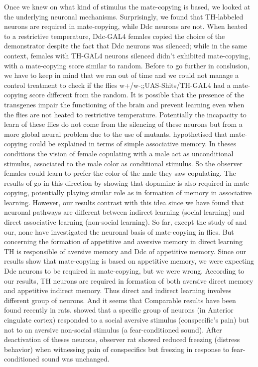 \documentclass[a4paper, 12pt]{article}
\begin{document}
Once we knew on what kind of stimulus the mate-copying is based, we looked at the underlying neuronal mechanisms. 
Surprisingly, we found that TH-labbeled neurons are required in mate-copying, while Ddc neurons are not. 
When heated to a restrictive temperature, Ddc-GAL4 females copied the choice of the demonstrator despite the fact that Ddc neurons was silenced; while in the same context, females with TH-GAL4 neurons silenced didn't exhibited mate-copying, with a mate-copying score similar to random. Before to go further in conslusion, we have to keep in mind that we ran out of time and we could not manage a control treatment to check if the flies w+/w-;;UAS-Shits/TH-GAL4 had a mate-copying score different from the random. It is possible that the presence of the transgenes impair the functioning of the brain and prevent learning even when the flies are not heated to restrictive temperature. Potentially the incapacity to learn of these flies do not come from the silencing of these neurons but from a more global neural problem due to the use of mutants.
\textcite{alvargues_information_2015} hypothetised that mate-copying could be explained in terms of simple associative memory. In theses conditions the vision of female copulating with a male act as unconditional stimulus, associated to the male color as conditional stimulus. So the observer females could learn to prefer the color of the male they saw copulating. The results of \textcite{monier_dopamine_2018} go in this direction by showing that dopamine is also required in mate-copying, potentially playing similar role as in formation of memory in associative learning. However, our results contrast with this idea since we have found that neuronal pathways are different between indirect learning (social learning) and direct associative learning (non-social learning).
So far, except the study of \textcite{monier_dopamine_2018} and our, none have investigated the neuronal basis of mate-copying in flies. But concerning the formation of appetitive and aversive memory in direct learning TH is responsible of aversive memory and Ddc of appetitive memory. Since our results show that mate-copying is based on appetitive memory, we were expecting Ddc neurons to be required in mate-copying, but we were wrong.
According to our results, TH neurons are required in formation of both aversive direct memory and appetitive indirect memory. 
Thus direct and indirect learning involves different group of neurons. 
And it seems that
Comparable results have been found recently in rats. \textcite{carrillo_emotional_2018} showed that a specific group of neurons (in Anterior cingulate cortex) responded to a social aversive stimulus (conspecific's pain) but not to an aversive non-social stimulus (a fear-conditioned sound). After deactivation of theses neurons, observer rat showed reduced freezing (distress behavior) when witnessing pain of conspecifics but freezing in response to fear-conditioned sound was unchanged.
\end{document}

